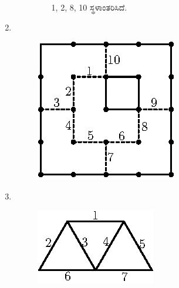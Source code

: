 \begin{enumerate}
\begin{itemize}
\begin{figure}[H]
\hspace{4cm}1, 2, 8, 10 ಸ್ಥಳಾಂತರಿಸಿದೆ. 
\end{figure}


\begin{minipage}[c]{5cm}
{\fontsize{9}{10}}
\end{minipage}
\qquad
\begin{minipage}[c]{4cm}
{\fontsize{9}{10}}
\end{minipage}
\end{itemize}

\item 
~

\begin{figure}[H]
\centering
\includegraphics{images/chap9/ans12.eps}

\end{figure}



\item 
~

\begin{figure}[H]
\centering
\includegraphics{images/chap9/ans13.eps}
\end{figure}


\end{enumerate}
